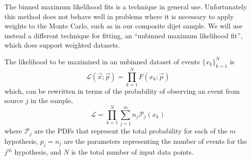 The binned maximum likelihood fits is a technique in general use. Unfortunately  this method does not behave well in problems where it is necessary to apply weights to the Monte Carlo, such as in our composite dijet sample. We will use instead a different technique for fitting, an ``unbinned maximum likelihood fit'', which does support weighted datasets. %

The likelihood to be maximized in an unbinned dataset of events $\{x_k\}^N_{k=1}$ is
%
\begin{equation}
\mathcal{L}(\vec{x};\vec{p}) =\prod^N_{k=1} F(x_k;\vec{p})
\end{equation}
%
which, can be rewritten in terms of the probability of observing an event from source $j$ in the sample,
%
\begin{equation}
\mathcal{L} =  \prod^N_{k=1} \sum^m_{j=1} n_j  \mathcal{P}_j(x_k)
\end{equation}
%
where $\mathcal{P}_j$ are the PDFs that represent the total probability for each of the $m$ hypothesis, $p_j=n_j$ are the parameters representing the number of events for the $j^{th}$ hypothesis, and $N$ is the total number of input data points.




